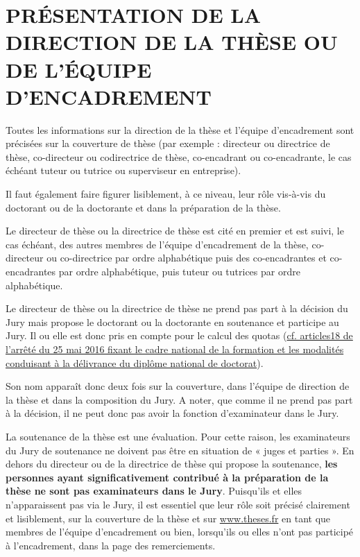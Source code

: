 \documentclass[french,12pt,a4paper]{book}
\begin{document}
\chapter{PRÉSENTATION DE LA DIRECTION DE LA THÈSE OU DE L’ÉQUIPE D’ENCADREMENT}
Toutes les informations sur la direction de la thèse et l’équipe d’encadrement sont précisées sur la couverture de thèse (par exemple : directeur ou directrice de thèse, co-directeur ou codirectrice de thèse, co-encadrant ou co-encadrante, le cas échéant tuteur ou tutrice ou superviseur en entreprise).\\ \par
Il faut également faire figurer lisiblement, à ce niveau, leur rôle vis-à-vis du doctorant ou de la doctorante et dans la préparation de la thèse.\\ \par
Le directeur de thèse ou la directrice de thèse est cité en premier et est suivi, le cas échéant, des autres membres de l’équipe d’encadrement de la thèse, co-directeur ou co-directrice par ordre alphabétique puis des co-encadrantes et co-encadrantes par ordre alphabétique, puis tuteur ou tutrices par ordre alphabétique.\\ \par
Le directeur de thèse ou la directrice de thèse ne prend pas part à la décision du Jury mais propose le doctorant ou la doctorante en soutenance et participe au Jury. Il ou elle est donc pris en compte pour le calcul des quotas (\href{https://www.legifrance.gouv.fr/affichTexte.do?cidTexte=JORFTEXT000032587086&dateTexte=20160902}{cf. articles18 de l’arrêté du 25 mai 2016 fixant le cadre national de la formation et les modalités conduisant à la délivrance du diplôme national de doctorat}).\\ \par
Son nom apparaît donc deux fois sur la couverture, dans l’équipe de direction de la thèse et dans la composition du Jury. A noter, que comme il ne prend pas part à la décision, il ne peut donc pas avoir la fonction d’examinateur dans le Jury.\\ \par
La soutenance de la thèse est une évaluation. Pour cette raison, les examinateurs du Jury de soutenance ne doivent pas être en situation de « juges et parties ». En dehors du directeur ou de la directrice de thèse qui propose la soutenance, \textbf{les personnes ayant significativement contribué à la préparation de la thèse ne sont pas examinateurs dans le Jury}. Puisqu’ils et elles n’apparaissent pas via le Jury, il est essentiel que leur rôle soit précisé clairement et lisiblement, sur la couverture de la thèse et sur \url{www.theses.fr} en tant que membres de l’équipe d’encadrement ou bien,  lorsqu’ils ou elles n’ont pas participé à l’encadrement, dans la page des remerciements.\\ \par 
\end{document}
